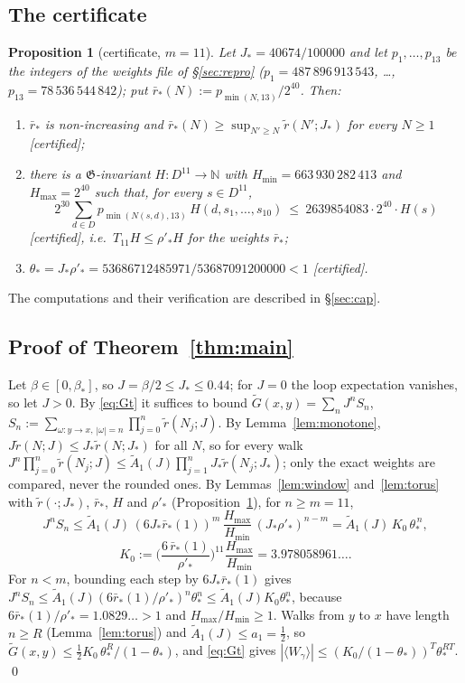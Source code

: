 \documentclass[11pt,a4paper]{article}
\theoremstyle{plain}
\newtheorem{proposition}[theorem]{Proposition}
\theoremstyle{remark}
\numberwithin{equation}{section}
\newcommand{\N}{\mathbb{N}}
\newcommand{\At}{\widetilde A}
\newcommand{\rt}{\widetilde r}
\newcommand{\rb}{\bar r}
\newcommand{\Gt}{\widetilde G}
\newcommand{\st}[1]{\textsf{[#1]}}
\begin{document}
\subsection{The certificate}
\begin{proposition}[certificate, $m=11$]\label{prop:cert}
Let $J_*=40674/100000$ and let $p_1,\dots,p_{13}$ be the integers of the weights file of \S\ref{sec:repro}
($p_1=487\,896\,913\,543$, \dots, $p_{13}=78\,536\,544\,842$); put $\rb_*(N):=p_{\min(N,13)}/2^{40}$. Then:
\begin{enumerate}
\item $\rb_*$ is non-increasing and $\rb_*(N)\ge\sup_{N'\ge N}\rt(N';J_*)$ for every $N\ge1$ \st{certified};
\item there is a $\mathfrak G$-invariant $H:D^{11}\to\N$ with $H_{\min}=663\,930\,282\,413$ and $H_{\max}=2^{40}$ such that, for every
$s\in D^{11}$,
\begin{equation}\label{eq:cert}
2^{30}\sum_{d\in D}p_{\min(N(s,d),13)}\,H(d,s_1,\dots,s_{10})\ \le\ 2639854083\cdot2^{40}\cdot H(s)
\end{equation}
\st{certified}, i.e.\ $T_{11}H\le\rho'_*H$ for the weights $\rb_*$;
\item $\theta_*=J_*\rho'_*=53686712485971/53687091200000<1$ \st{certified}.
\end{enumerate}
\end{proposition}
\noindent The computations and their verification are described in \S\ref{sec:cap}.

\subsection{Proof of Theorem~\ref{thm:main}}\label{sec:proof}
Let $\beta\in[0,\beta_*]$, so $J=\beta/2\le J_*\le0.44$; for $J=0$ the loop expectation vanishes, so let $J>0$. By \eqref{eq:Gt} it
suffices to bound $\Gt(x,y)=\sum_nJ^nS_n$, $S_n:=\sum_{\omega:y\to x,\,|\omega|=n}\prod_{j=0}^n\rt(N_j;J)$. By
Lemma~\ref{lem:monotone}, $J\rt(N;J)\le J_*\rt(N;J_*)$ for all $N$, so for every walk
$J^n\prod_{j=0}^n\rt(N_j;J)\le\At_1(J)\prod_{j=1}^nJ_*\rt(N_j;J_*)$; only the exact weights are compared, never the rounded ones. By
Lemmas~\ref{lem:window} and~\ref{lem:torus} with $\rt(\cdot;J_*)$, $\rb_*$, $H$ and $\rho'_*$ (Proposition~\ref{prop:cert}), for
$n\ge m=11$,
\[
J^nS_n\le\At_1(J)\,(6J_*\rb_*(1))^m\,\frac{H_{\max}}{H_{\min}}\,(J_*\rho'_*)^{n-m}=\At_1(J)\,K_0\,\theta_*^{\,n},
\]
\begin{equation}\label{eq:K0}
K_0:=\Big(\frac{6\,\rb_*(1)}{\rho'_*}\Big)^{11}\frac{H_{\max}}{H_{\min}}=3.978058961\ldots .
\end{equation}
For $n<m$, bounding each step by $6J_*\rb_*(1)$ gives $J^nS_n\le\At_1(J)(6\rb_*(1)/\rho'_*)^n\theta_*^n\le\At_1(J)K_0\theta_*^n$,
because $6\rb_*(1)/\rho'_*=1.0829\ldots>1$ and $H_{\max}/H_{\min}\ge1$. Walks from $y$ to $x$ have length $n\ge R$
(Lemma~\ref{lem:torus}) and $\At_1(J)\le a_1=\frac12$, so $\Gt(x,y)\le\frac12K_0\,\theta_*^R/(1-\theta_*)$, and \eqref{eq:Gt} gives
$|\langle W_\gamma\rangle|\le(K_0/(1-\theta_*))^T\theta_*^{RT}$. \qed
\end{document}

